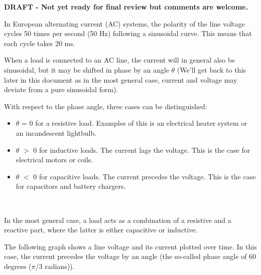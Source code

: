 \documentclass[a4paper]{article}
\begin{document}
\textbf{DRAFT - Not yet ready for final review but comments are welcome.}\

In European alternating current (AC) systems, the polarity of the line
voltage cycles 50 times per second (50 Hz) following a sinusoidal curve. 
This means that each cycle takes 20 ms.\

When a load is connected to an AC line, the current will in general also
be sinusoidal, but it may be shifted in phase by an angle $\theta$ (We'll 
get back to this later in this document as in the most general case,
current and voltage may deviate from a pure sinusoidal form).\

With respect to the phase angle, three cases can be distinguished:

\begin{itemize}
	\item $\theta$ = 0 for a resistive load. Examples of this is an electrical heater system or an incandescent lightbulb.
	\item $\theta$ $>$ 0 for inductive loads. The current lags the voltage. This is the case for electrical motors or coils.
	\item  $\theta$ $<$ 0 for capacitive loads. The current precedes the voltage. This is the case for capacitors and battery chargers.
\end{itemize}\

In the most general case, a load acts as a combination of a resistive 
and a reactive part, where the latter is either capacitive or inductive.\

The following graph shows a line voltage and its current plotted over time. In
this case, the current precedes the voltage by an angle (the so-called phase
angle of 60 degrees ($\pi$/3 radians)).\


\
\end{document}
